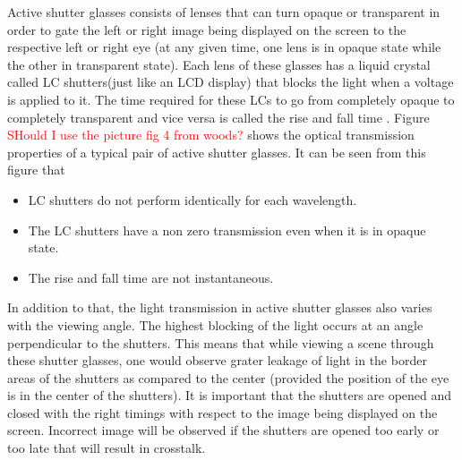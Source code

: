 Active shutter glasses consists of lenses that can turn opaque or transparent in order to gate the left or right image being displayed on the screen to the respective left or right eye (at any given time, one lens is in opaque state while the other in transparent state). Each lens of these glasses has a liquid crystal called LC shutters(just like an LCD display) that blocks the light when a voltage is applied to it. The time required for these LCs to go from completely opaque to completely transparent and vice versa is called the rise and fall time \cite{woods2012crosstalk}. Figure \textcolor{red}{SHould I use the picture fig 4 from woods?} shows the optical transmission properties of a typical pair of active shutter glasses. It can be seen from this figure that
\begin{figure}
\end{figure}

\begin{itemize}
\item{LC shutters do not perform identically for each wavelength.}
\item{The LC shutters have a non zero transmission even when it is in opaque state.}
\item{The rise and fall time are not instantaneous.}
\end{itemize}

In addition to that, the light transmission in active shutter glasses also varies with the viewing angle. The highest blocking of the light occurs at an angle perpendicular to the shutters. This means that while viewing a scene through these shutter glasses, one would observe grater leakage of light in the border areas of the shutters as compared to the center (provided the position of the eye is in the center of the shutters). It is important that the shutters are opened and closed with the right timings with respect to the image being displayed on the screen. Incorrect image will be observed if the shutters are opened too early or too late that will result in crosstalk.

